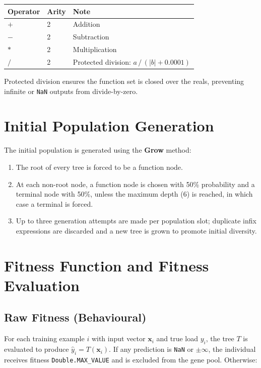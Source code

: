 \documentclass[12pt,a4paper]{article}
\begin{document}
\begin{center}
\begin{tabular}{@{}lll@{}}
\toprule
\textbf{Operator} & \textbf{Arity} & \textbf{Note} \\
\midrule
$+$ & 2 & Addition \\
$-$ & 2 & Subtraction \\
$*$ & 2 & Multiplication \\
$/$ & 2 & Protected division: $a\,/\,(|b|+0.0001)$ \\
\bottomrule
\end{tabular}
\end{center}

Protected division ensures the function set is closed over the reals, preventing
infinite or \texttt{NaN} outputs from divide-by-zero.

\section{Initial Population Generation}

The initial population is generated using the \textbf{Grow} method:

\begin{enumerate}
  \item The root of every tree is forced to be a function node.
  \item At each non-root node, a function node is chosen with 50\% probability
        and a terminal node with 50\%, unless the maximum depth (6) is reached,
        in which case a terminal is forced.
  \item Up to three generation attempts are made per population slot; duplicate
        infix expressions are discarded and a new tree is grown to promote initial
        diversity.
\end{enumerate}

\section{Fitness Function and Fitness Evaluation}

\subsection{Raw Fitness (Behavioural)}

For each training example $i$ with input vector $\mathbf{x}_i$ and true load $y_i$,
the tree $T$ is evaluated to produce $\hat{y}_i = T(\mathbf{x}_i)$. If any
prediction is \texttt{NaN} or $\pm\infty$, the individual receives fitness
\texttt{Double.MAX\_VALUE} and is excluded from the gene pool. Otherwise:
\end{document}
